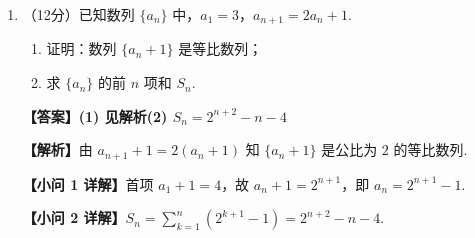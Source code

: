 \documentclass[12pt,a4paper]{ctexart}
\newcommand{\daan}[1]{{\color{red}\textbf{【答案】#1}}}
\newcommand{\jieti}{\par{\color{gray!60!black}\textbf{【解析】}}}
\newcommand{\xiaoI}{\par{\color{blue!60!black}\textbf{【小问 1 详解】}}}
\newcommand{\xiaoII}{\par{\color{blue!60!black}\textbf{【小问 2 详解】}}}
\begin{document}
\begin{enumerate}[resume]
    \item （12分）已知数列 $\{a_n\}$ 中，$a_1=3$，$a_{n+1}=2a_n+1$.
    \begin{enumerate}
        \item 证明：数列 $\{a_n+1\}$ 是等比数列；
        \item 求 $\{a_n\}$ 的前 $n$ 项和 $S_n$.
    \end{enumerate}
    \daan{(1) 见解析\quad (2) $S_n=2^{n+2}-n-4$}
    \jieti 由 $a_{n+1}+1=2(a_n+1)$ 知 $\{a_n+1\}$ 是公比为 $2$ 的等比数列.
    \xiaoI 首项 $a_1+1=4$，故 $a_n+1=2^{n+1}$，即 $a_n=2^{n+1}-1$.
    \xiaoII $S_n=\sum_{k=1}^{n}(2^{k+1}-1)=2^{n+2}-n-4$.
\end{enumerate}
\end{document}
